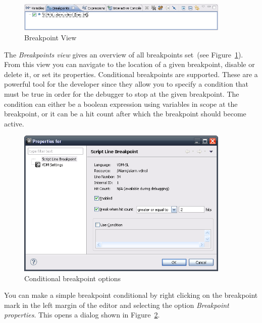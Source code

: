{\begin{figure}[htp]
\begin{center}
  \caption{Breakpoint View}
  \label{fig:BreakpointView}
  \includegraphics[width=4in]{figures/BreakpointView}
\end{center}
\end{figure}

The \emph{Breakpoints view} gives an overview of all breakpoints
set~(see Figure~\ref{fig:BreakpointView}). From this view
you can navigate to the location of a given breakpoint, disable or
delete it, or set its properties.
Conditional breakpoints are supported. These are a powerful tool for
the developer since they allow you to specify a condition that must be
true in order for the debugger to stop at the given breakpoint. The
condition can either be a boolean expression using variables in scope
at the breakpoint, or it can be a hit count after which the breakpoint
should become active.

\begin{figure}[htp]
\begin{center}
  \includegraphics[width=4in]{figures/Breakpointconditional}
  \caption{Conditional breakpoint options}
  \label{fig:BreakpointConditional}
\end{center}
\end{figure}

You can make a simple breakpoint conditional by right clicking on the
breakpoint mark in the left margin of the editor and selecting the
option \emph{Breakpoint properties}. This opens a dialog shown in
Figure~\ref{fig:BreakpointConditional}.

}
